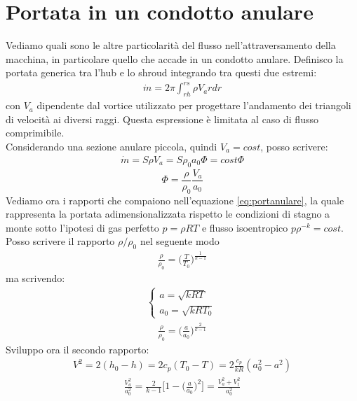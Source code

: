 \section{Portata in un condotto anulare}
Vediamo quali sono le altre particolarità del flusso nell'attraversamento della macchina, in particolare quello che accade in un condotto anulare. Definisco la portata generica tra l'hub e lo shroud integrando tra questi due estremi:
\begin{align*}
\dot{m} = 2 \pi \int_{rh}^{rs} \rho V_a r dr
\end{align*}
con $V_a$ dipendente dal vortice utilizzato per progettare l'andamento dei triangoli di velocità ai diversi raggi. Questa espressione è limitata al caso di flusso comprimibile.\\
Considerando una sezione anulare piccola, quindi $V_a = cost$, posso scrivere:
\begin{align*}
\dot{m} = S \rho V_a = S \rho_0 a_0 \Phi = cost \Phi
\end{align*}
\begin{equation}\label{eq:portanulare}
\Phi = \frac{\rho}{\rho_0} \frac{V_a}{a_0}
\end{equation}
Vediamo ora i rapporti che compaiono nell'equazione \ref{eq:portanulare}, la quale rappresenta la portata adimensionalizzata rispetto le condizioni di stagno a monte sotto l'ipotesi di gas perfetto $p = \rho RT$ e flusso isoentropico $p \rho^{-k} = cost$.
Posso scrivere il rapporto $\rho/\rho_0$ nel seguente modo
\begin{align*}
\frac{\rho}{\rho_0} = \bigg( \frac{T}{T_0} \bigg)^{\frac{1}{k-1}} 
\end{align*}
ma scrivendo:
\begin{align*}
\begin{cases}
a = \sqrt{kRT}\\
a_0 = \sqrt{kRT_0}
\end{cases}
\end{align*}
\begin{align*}
\frac{\rho}{\rho_0} = \bigg( \frac{a}{a_0} \bigg)^{\frac{2}{k-1}}
\end{align*}
Sviluppo ora il secondo rapporto:
\begin{align*}
V^2 = 2 (h_0 - h) = 2 c_p (T_0 - T) = 2 \frac{c_p}{kR} (a_0^2 - a^2)
\end{align*}
\begin{align*}
\frac{V_a^2}{a_0^2} = \frac{2}{k-1} \bigg[ 1- \bigg( \frac{a}{a_0} \bigg)^2 \bigg] = \frac{V_a^2 + V_t^2}{a_0^2}
\end{align*}
